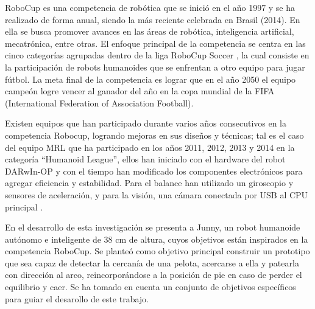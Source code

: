 RoboCup \cite{robotcup} es una competencia de robótica que se inició en el año 1997 y se ha realizado de forma anual, siendo la más reciente celebrada en Brasil (2014). En ella se busca promover avances en las áreas de robótica, inteligencia artificial, mecatrónica, entre otras. El enfoque principal de la competencia se centra en las cinco categorías agrupadas dentro de la liga RoboCup Soccer \cite{robotcupsoccer}, la cual consiste en la participación de robots humanoides que se enfrentan a otro equipo para jugar fútbol. La meta final de la competencia es lograr que en el año 2050 el equipo campeón logre vencer al ganador del año en la copa mundial de la FIFA (International Federation of Association Football).

Existen equipos que han participado durante varios años consecutivos en la competencia Robocup, logrando mejoras en sus diseños y técnicas; tal es el caso del equipo MRL que ha participado en los años 2011, 2012, 2013 y 2014 en la categoría “Humanoid League”, ellos han iniciado con el hardware del robot DARwIn-OP y con el tiempo han modificado los componentes electrónicos para agregar eficiencia y estabilidad. Para el balance han utilizado un giroscopio y sensores de aceleración, y para la visión, una cámara conectada por USB al CPU principal \cite{paper1}.

 

En el desarrollo de esta investigaci\'on se presenta a Junny, un robot humanoide aut\'onomo e inteligente de 38 cm de altura, cuyos objetivos están inspirados en la competencia RoboCup. Se planteó como objetivo principal construir un prototipo que sea capaz de detectar la cercanía de una pelota, acercarse a ella y patearla con direcci\'on al arco, reincorpor\'andose a la posici\'on de pie en caso de perder el equilibrio y caer. Se ha tomado en cuenta un conjunto de objetivos específicos para guiar el desarollo de este trabajo. %


